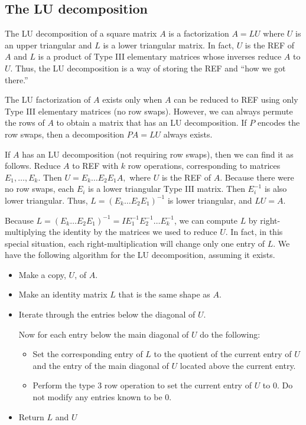 \subsection*{The LU decomposition}
The LU decomposition of a square matrix $A$ is a factorization $A=LU$ where $U$ is an upper triangular and $L$ is a lower triangular matrix. 
In fact, $U$ is the REF of $A$ and $L$ is a product of Type III elementary matrices whose inverses reduce $A$ to $U$. 
Thus, the LU decomposition is a way of storing the REF and ``how we got there.''

The LU factorization of $A$ exists only when $A$ can be reduced to REF using only Type III elementary matrices (no row swaps). 
However, we can always permute the rows of $A$ to obtain a matrix that has an LU decomposition. 
If $P$ encodes the row swaps, then a decomposition $PA = LU$ always exists. 

If $A$ has an LU decomposition (not requiring row swaps), then we can find it as follows. 
Reduce $A$ to REF with $k$ row operations, corresponding to matrices $E_1, \ldots, E_k$. 
Then $U = E_k \ldots E_2E_1A,$ where $U$ is the REF of $A$. 
Because there were no row swaps, each $E_i$ is a lower triangular Type III matrix. Then $E_i^{-1}$ is also lower triangular. 
Thus, $L=(E_k \ldots E_2E_1)^{-1}$ is lower triangular, and $LU=A.$

Because $L=(E_k \ldots E_2E_1)^{-1} = IE_1^{-1}E_2^{-1}\ldots E_k^{-1}$, we can compute $L$ by right-multiplying the identity by the matrices we used to reduce $U$. 
In fact, in this special situation, each right-multiplication will change only one entry of $L$. 
We have the following algorithm for the LU decomposition, assuming it exists.

\begin{itemize}
\item Make a copy, $U$, of $A$.
\item Make an identity matrix $L$ that is the same shape as $A$.
\item Iterate through the entries below the diagonal of $U$.

Now for each entry below the main diagonal of $U$ do the following:
	\begin{itemize}
	\item Set the corresponding entry of $L$ to the quotient of the current entry of $U$ and the entry of the main diagonal of $U$ located above the current entry.
	\item Perform the type 3 row operation to set the current entry of $U$ to 0.
		Do not modify any entries known to be 0.
	\end{itemize}
\item Return $L$ and $U$
\end{itemize}

